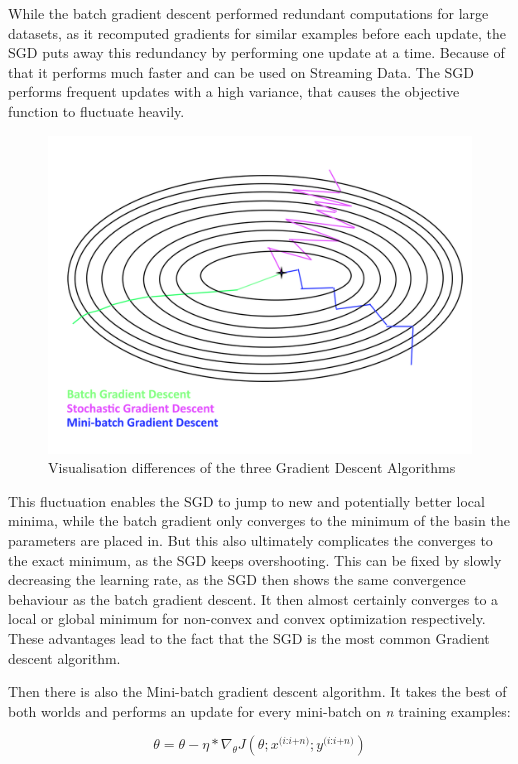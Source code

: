 \documentclass[12pt,oneside,a4paper,parskip]{scrbook}
\begin{document}
While the batch gradient descent performed redundant computations for large datasets, as it recomputed gradients for similar examples 
before each update, the SGD puts away this redundancy by performing one update at a time. Because of that it performs much faster and 
can be used on Streaming Data.
The SGD performs frequent updates with a high variance, that causes the objective function to fluctuate heavily. 

\begin{figure}
  \centering
  \includegraphics[width=0.7\columnwidth]{Gradient_desc_types}
  \caption{Visualisation differences of the three Gradient Descent Algorithms}
  \label{fig:comp_GD}
\end{figure}

This fluctuation enables the SGD to jump to new and potentially better local minima, while the batch gradient only converges 
to the minimum of the basin the parameters are placed in. But this also ultimately complicates the converges to the exact minimum, 
as the SGD keeps overshooting. This can be fixed by slowly decreasing the learning rate, as the SGD then shows the same 
convergence behaviour as the batch gradient descent. It then almost certainly converges to a local or global minimum for
non-convex and convex optimization respectively. \cite{overvieDiffRSLVQ}
These advantages lead to the fact that the SGD is the most common Gradient descent algorithm.

Then there is also the Mini-batch gradient descent algorithm. It takes the best of both worlds and performs an update for
every mini-batch on \textit{n} training examples:

\begin{equation}
\theta = \theta - \eta * \nabla_\theta \textit{J}(\theta;\textit{x}^\textit{(i:i+n)};\textit{y}^\textit{(i:i+n)})
\end{equation}
\end{document}
